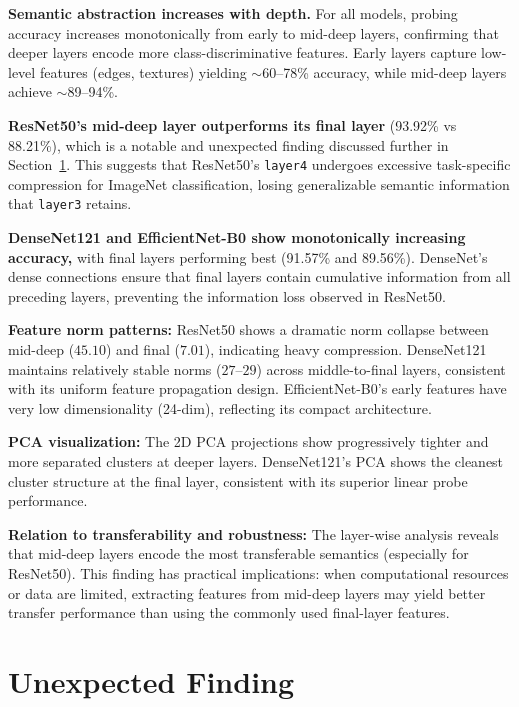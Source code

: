 \documentclass[11pt, a4paper]{article}
\begin{document}
\textbf{Semantic abstraction increases with depth.} For all models, probing accuracy increases monotonically from early to mid-deep layers, confirming that deeper layers encode more class-discriminative features. Early layers capture low-level features (edges, textures) yielding $\sim$60–78\% accuracy, while mid-deep layers achieve $\sim$89–94\%.

\textbf{ResNet50's mid-deep layer outperforms its final layer} (93.92\% vs 88.21\%), which is a notable and unexpected finding discussed further in Section~\ref{sec:unexpected}. This suggests that ResNet50's \texttt{layer4} undergoes excessive task-specific compression for ImageNet classification, losing generalizable semantic information that \texttt{layer3} retains.

\textbf{DenseNet121 and EfficientNet-B0 show monotonically increasing accuracy,} with final layers performing best (91.57\% and 89.56\%). DenseNet's dense connections ensure that final layers contain cumulative information from all preceding layers, preventing the information loss observed in ResNet50.

\textbf{Feature norm patterns:} ResNet50 shows a dramatic norm collapse between mid-deep ($45.10$) and final ($7.01$), indicating heavy compression. DenseNet121 maintains relatively stable norms ($27$--$29$) across middle-to-final layers, consistent with its uniform feature propagation design. EfficientNet-B0's early features have very low dimensionality (24-dim), reflecting its compact architecture.

\textbf{PCA visualization:} The 2D PCA projections show progressively tighter and more separated clusters at deeper layers. DenseNet121's PCA shows the cleanest cluster structure at the final layer, consistent with its superior linear probe performance.

\textbf{Relation to transferability and robustness:} The layer-wise analysis reveals that mid-deep layers encode the most transferable semantics (especially for ResNet50). This finding has practical implications: when computational resources or data are limited, extracting features from mid-deep layers may yield better transfer performance than using the commonly used final-layer features.


\section{Unexpected Finding}
\label{sec:unexpected}
\end{document}
